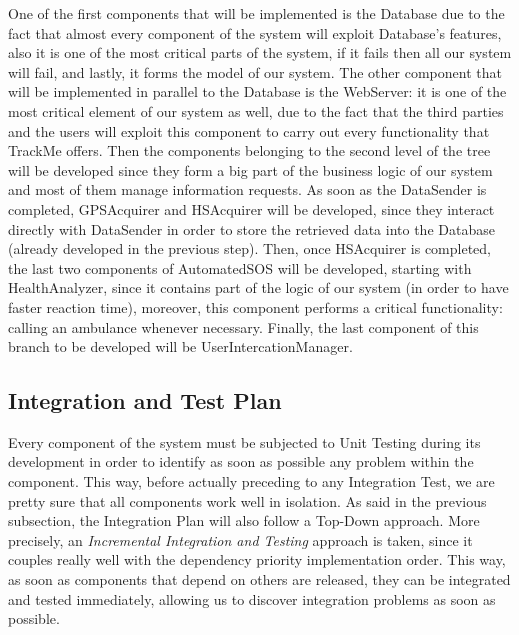 \noindent
One of the first components that will be implemented is the Database due to the fact that almost every component of the system will exploit Database's features, also it is one of the most critical parts of the system, if it fails then all our system will fail, and lastly, it forms the model of our system.
\medbreak
\noindent
The other component that will be implemented in parallel to the Database is the WebServer: it is one of the most critical element of our system as well, due to the fact that the third parties and the users will exploit this component to carry out every functionality that TrackMe offers.
\medbreak
\noindent
Then the components belonging to the second level of the tree will be developed since they form a big part of the business logic of our system and most of them manage information requests.
\medbreak
\noindent
As soon as the DataSender is completed, GPSAcquirer and HSAcquirer will be developed, since they interact directly with DataSender in order to store the retrieved data into the Database (already developed in the previous step). Then, once HSAcquirer is completed, the last two components of AutomatedSOS will be developed, starting with HealthAnalyzer, since it contains part of the logic of our system (in order to have faster reaction time), moreover, this component performs a critical functionality: calling an ambulance whenever necessary. Finally, the last component of this branch to be developed will be UserIntercationManager.

\subsection{Integration and Test Plan}
Every component of the system must be subjected to Unit Testing during its development in order to identify as soon as possible any problem within the component. This way, before actually preceding to any Integration Test, we are pretty sure that all components work well in isolation.
\medbreak
\noindent
As said in the previous subsection, the Integration Plan will also follow a Top-Down approach. More precisely, an \textit{Incremental Integration and Testing} approach is taken, since it couples really well with the dependency priority implementation order. This way, as soon as components that depend on others are released, they can be integrated and tested immediately, allowing us to discover integration problems as soon as possible.

